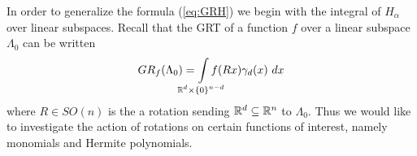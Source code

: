 
In order to generalize the formula (\ref{eq:GRH}) we begin with the integral of $H_\alpha$ over linear subspaces. Recall that the GRT of a function $f$ over a linear subspace $\Lambda_0$ can be written
\begin{equation} \label{eq:GRRot}
  GR_f(\Lambda_0) = \int\mclimits_{\RR^d \times {\{0\}}^{n-d}} f(Rx) \gamma_d(x) ~dx
\end{equation}
where $R \in SO(n)$ is the a rotation sending $\mathbb{R}^d \subseteq \mathbb{R}^n$ to $\Lambda_0$. Thus we would like to investigate the action of rotations on certain functions of interest, namely monomials and Hermite polynomials.

